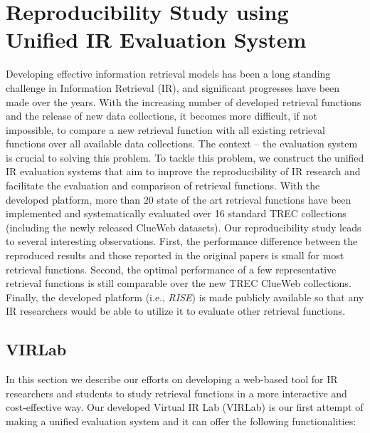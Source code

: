 %
%
\chapter{Reproducibility Study using Unified IR Evaluation System}

Developing effective information retrieval models has been a 
long standing challenge in Information Retrieval (IR), and significant 
progresses have been made over the years. With the increasing 
number of developed retrieval functions and the release of 
new data collections, it becomes more difficult, if not impossible, 
to compare a new retrieval function with all existing retrieval 
functions over all available data collections.  
The context -- the evaluation system is crucial to solving this problem.
To tackle this problem, we construct the unified IR evaluation systems 
that aim to improve the reproducibility of IR research
and facilitate the evaluation and comparison of retrieval functions. 
With the developed platform, more than 20 state of the art 
retrieval functions have been implemented and systematically 
evaluated over 16 standard TREC collections (including the newly 
released ClueWeb datasets). Our reproducibility study leads to 
several interesting observations. First, the performance difference
between the reproduced results and those reported in the original 
papers is small for most retrieval functions.  Second, the optimal 
performance of a few representative retrieval functions is still 
comparable over the new TREC ClueWeb collections. 
Finally, the developed platform (i.e., {\em RISE}) is made publicly 
available so that any IR researchers would be able to utilize 
it to evaluate other retrieval functions. 


\section{VIRLab}

In this section we describe our efforts on developing a web-based
tool for IR researchers and students to study retrieval functions 
in a more interactive and cost-effective way. 
Our developed Virtual IR Lab (VIRLab) is our first attempt of making 
a unified evaluation system and it can offer the following functionalities:

